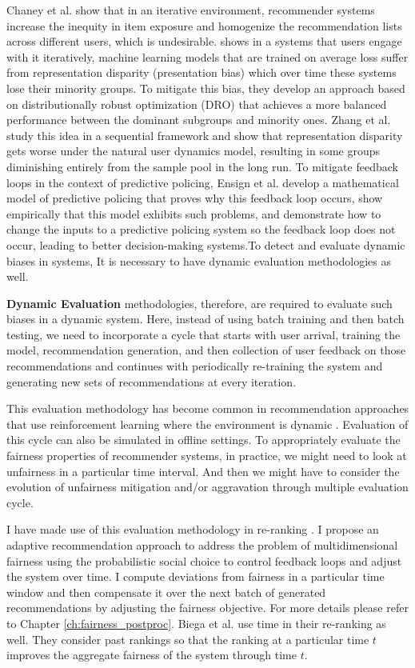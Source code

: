     Chaney et al. \cite{Chaney2018Homo} show that in an iterative environment, recommender systems increase the inequity in item exposure and homogenize the recommendation lists across different users, which is undesirable. \cite{pmlr-v80-hashimoto18a} shows in a systems that users engage with it iteratively, machine learning models that are trained on average loss suffer from representation disparity (presentation bias) which over time these systems lose their minority groups. To mitigate this bias, they develop an approach based on distributionally robust optimization (DRO) that achieves a more balanced performance between the dominant subgroups and minority ones. Zhang et al. \cite{NEURIPS2019_7690dd4d} study this idea in a sequential framework and show that representation disparity gets worse under the natural user dynamics model, resulting in some groups diminishing entirely from the sample pool in the long run. To mitigate feedback loops in the context of predictive policing, Ensign et al. \cite{pmlr-v81-ensign18a} develop a mathematical model of predictive policing that proves why this feedback loop occurs, show empirically that this model exhibits such problems, and demonstrate how to change the inputs to a predictive policing system so the feedback loop does not occur, leading to better decision-making systems.To detect and evaluate dynamic biases in systems, It is necessary to have dynamic evaluation methodologies as well.
    
    \textbf{Dynamic Evaluation} methodologies, therefore, are required to evaluate such biases in a dynamic system. Here, instead of using batch training and then batch testing, we need to incorporate a cycle that starts with user arrival, training the model, recommendation generation, and then collection of user feedback on those recommendations and continues with periodically re-training the system and generating new sets of recommendations at every iteration.
    
    This evaluation methodology has become common in recommendation approaches that use reinforcement learning where the environment is dynamic \cite{Lihong2010bandit,Zheng2018DRN}. Evaluation of this cycle can also be simulated in offline settings. To appropriately evaluate the fairness properties of recommender systems, in practice, we might need to look at unfairness in a particular time interval. And then we might have to consider the evolution of unfairness mitigation and/or aggravation through multiple evaluation cycle.
    
    I have made use of this evaluation methodology in re-ranking \cite{sonboli2020dynm}. I propose an adaptive recommendation approach to address the problem of multidimensional fairness using the probabilistic social choice to control feedback loops and adjust the system over time. I compute deviations from fairness in a particular time window and then compensate it over the next batch of generated recommendations by adjusting the fairness objective. For more details please refer to Chapter \ref{ch:fairness_postproc}. Biega et al. \cite{biega2018equity} use time in their re-ranking as well. They consider past rankings so that the ranking at a particular time $t$ improves the aggregate fairness of the system through time $t$.
    
